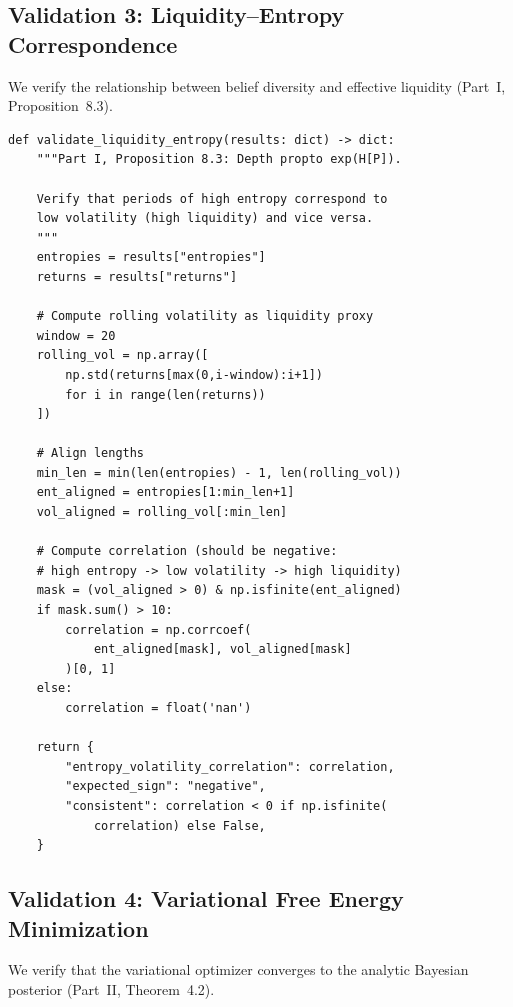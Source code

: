 \documentclass[12pt,a4paper]{article}
\theoremstyle{definition}
\begin{document}
\subsection{Validation 3: Liquidity--Entropy Correspondence}

We verify the relationship between belief diversity and effective liquidity (Part~I, Proposition~8.3).

\begin{lstlisting}[caption={Validation: Liquidity--entropy correspondence},label=lst:val3]
def validate_liquidity_entropy(results: dict) -> dict:
    """Part I, Proposition 8.3: Depth propto exp(H[P]).
    
    Verify that periods of high entropy correspond to
    low volatility (high liquidity) and vice versa.
    """
    entropies = results["entropies"]
    returns = results["returns"]
    
    # Compute rolling volatility as liquidity proxy
    window = 20
    rolling_vol = np.array([
        np.std(returns[max(0,i-window):i+1])
        for i in range(len(returns))
    ])
    
    # Align lengths
    min_len = min(len(entropies) - 1, len(rolling_vol))
    ent_aligned = entropies[1:min_len+1]
    vol_aligned = rolling_vol[:min_len]
    
    # Compute correlation (should be negative:
    # high entropy -> low volatility -> high liquidity)
    mask = (vol_aligned > 0) & np.isfinite(ent_aligned)
    if mask.sum() > 10:
        correlation = np.corrcoef(
            ent_aligned[mask], vol_aligned[mask]
        )[0, 1]
    else:
        correlation = float('nan')
    
    return {
        "entropy_volatility_correlation": correlation,
        "expected_sign": "negative",
        "consistent": correlation < 0 if np.isfinite(
            correlation) else False,
    }
\end{lstlisting}

\subsection{Validation 4: Variational Free Energy Minimization}

We verify that the variational optimizer converges to the analytic Bayesian posterior (Part~II, Theorem~4.2).
\end{document}
